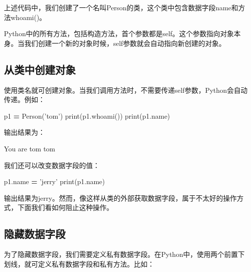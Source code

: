 \documentclass[]{ctexbook}
\newenvironment{Shaded}{\begin{snugshade}}{\end{snugshade}}
\newcommand{\BuiltInTok}[1]{#1}
\newcommand{\NormalTok}[1]{#1}
\newcommand{\OperatorTok}[1]{\textcolor[rgb]{0.81,0.36,0.00}{\textbf{#1}}}
\newcommand{\StringTok}[1]{\textcolor[rgb]{0.31,0.60,0.02}{#1}}
\begin{document}
上述代码中，我们创建了一个名叫Person的类，这个类中包含数据字段name和方法whoami()。

Python中的所有方法，包括构造方法，首个参数都是self。这个参数指向对象本身。当我们创建一个新的对象时候，self参数就会自动指向新创建的对象。

\hypertarget{ux4eceux7c7bux4e2dux521bux5efaux5bf9ux8c61}{%
\subsection{从类中创建对象}\label{ux4eceux7c7bux4e2dux521bux5efaux5bf9ux8c61}}

使用类名就可创建对象。当我们调用方法时，不需要传递self参数，Python会自动传递。例如：

\begin{Shaded}
\begin{Highlighting}[]
\NormalTok{p1 }\OperatorTok{=}\NormalTok{ Person(}\StringTok{'tom'}\NormalTok{)}
\BuiltInTok{print}\NormalTok{(p1.whoami())}
\BuiltInTok{print}\NormalTok{(p1.name)}
\end{Highlighting}
\end{Shaded}

输出结果为：

\begin{Shaded}
\begin{Highlighting}[]
\NormalTok{You are tom}
\NormalTok{tom}
\end{Highlighting}
\end{Shaded}

我们还可以改变数据字段的值：

\begin{Shaded}
\begin{Highlighting}[]
\NormalTok{p1.name }\OperatorTok{=} \StringTok{'jerry'}
\BuiltInTok{print}\NormalTok{(p1.name)}
\end{Highlighting}
\end{Shaded}

输出结果为jerry。然而，像这样从类的外部获取数据字段，属于不太好的操作方式，下面我们看如何阻止这种操作。

\hypertarget{ux9690ux85cfux6570ux636eux5b57ux6bb5}{%
\subsection{隐藏数据字段}\label{ux9690ux85cfux6570ux636eux5b57ux6bb5}}

为了隐藏数据字段，我们需要定义私有数据字段。在Python中，使用两个前置下划线，就可定义私有数据字段和私有方法。比如：
\end{document}
